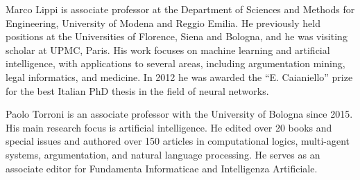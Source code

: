 \documentclass[journal]{IEEEtran}
\begin{document}
\begin{IEEEbiography}{Marco Lippi} is associate professor at the Department of Sciences and Methods for Engineering, University of Modena and Reggio Emilia. He previously held positions at the Universities of Florence, Siena and Bologna, and he was visiting scholar at UPMC, Paris.
His work focuses on machine learning and artificial intelligence, with applications to several areas, including argumentation mining, legal informatics, and medicine.
In 2012 he was awarded the ``E. Caianiello'' prize for the best Italian PhD thesis in the field of neural networks.
\end{IEEEbiography}



\begin{IEEEbiography}{Paolo Torroni} is an associate professor with the University of Bologna since 2015. His main research focus is artificial intelligence. He edited over 20 books and special issues and authored over 150 articles in computational logics, multi-agent systems, argumentation, and natural language processing. He serves as an associate editor for Fundamenta Informaticae and Intelligenza Artificiale.
\end{IEEEbiography}
\end{document}
